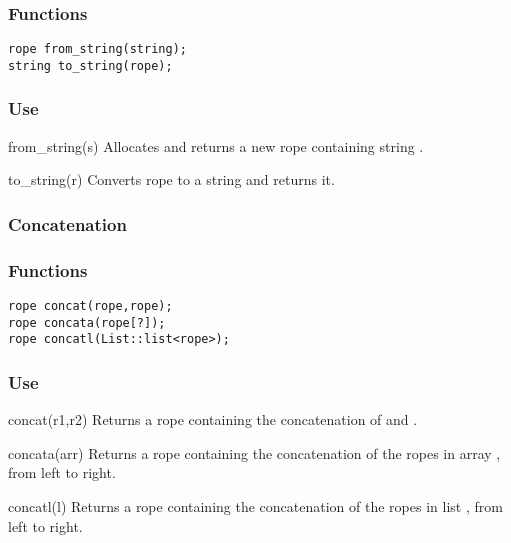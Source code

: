 \subsubsection*{Functions}
\begin{verbatim}
rope from_string(string);
string to_string(rope);
\end{verbatim}

\subsubsection*{Use}

\begin{defun}{from_string}{(s)}
Allocates and returns a new rope containing string .
\end{defun}

\begin{defun}{to_string}{(r)}
Converts rope  to a string and returns it.
\end{defun}

\subsubsection*{Concatenation}
\subsubsection*{Functions}
\begin{verbatim}
rope concat(rope,rope);
rope concata(rope[?]);
rope concatl(List::list<rope>);
\end{verbatim}

\subsubsection*{Use}

\begin{defun}{concat}{(r1,r2)}
Returns a rope containing the concatenation of  and .
\end{defun}

\begin{defun}{concata}{(arr)}
Returns a rope containing the concatenation of the ropes in array
, from left to right.
\end{defun}

\begin{defun}{concatl}{(l)}
Returns a rope containing the concatenation of the ropes in list
, from left to right.
\end{defun}

